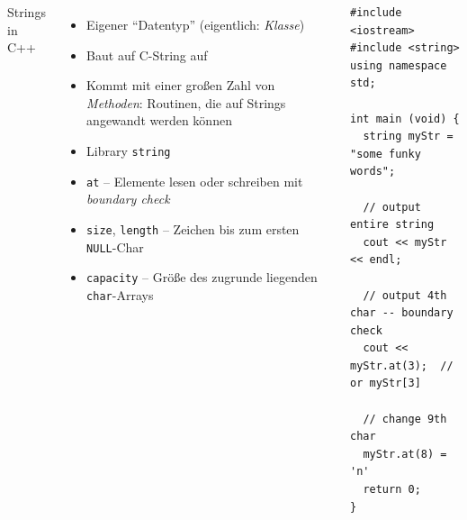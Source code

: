 \begin{frame}[fragile]
%
\begin{columns}[T]
\begin{Large}
{Strings in C++}
\vspace{10pt}
\end{Large}
%
\begin{itemize}
\item Eigener \enquote{Datentyp} (eigentlich: \emph{Klasse})
\item Baut auf C-String auf
\item Kommt mit einer großen Zahl von \emph{Methoden}: Routinen, die auf Strings angewandt werden können
\item Library \texttt{string}
\item \texttt{at} -- Elemente lesen oder schreiben mit \emph{boundary check}
\item \texttt{size}, \texttt{length} -- Zeichen bis zum ersten \texttt{NULL}-Char
\item \texttt{capacity} -- Größe des zugrunde liegenden \texttt{char}-Arrays
\end{itemize}
%
\begin{codebox}
\begin{verbatim}
#include <iostream>
#include <string>
using namespace std;

int main (void) {
  string myStr = "some funky words";
  
  // output entire string
  cout << myStr << endl;
  
  // output 4th char -- boundary check
  cout << myStr.at(3);  // or myStr[3]
  
  // change 9th char
  myStr.at(8) = 'n'
  return 0;
}
\end{verbatim}
\end{codebox}
\end{columns}
%
\end{frame}


